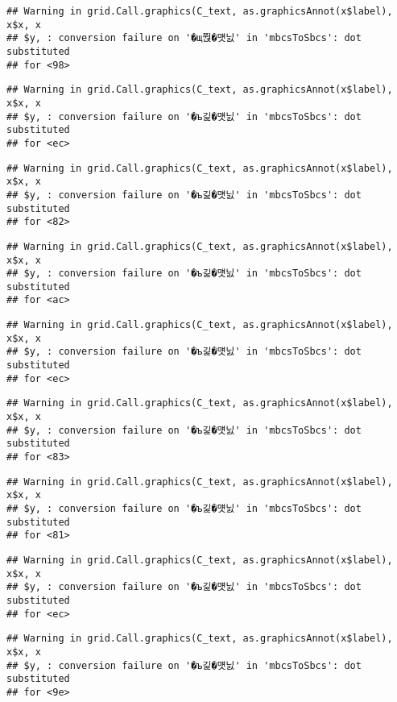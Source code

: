 \documentclass[]{article}
\begin{document}
\begin{verbatim}
## Warning in grid.Call.graphics(C_text, as.graphicsAnnot(x$label), x$x, x
## $y, : conversion failure on '�щ쭩�먯닔' in 'mbcsToSbcs': dot substituted
## for <98>
\end{verbatim}

\begin{verbatim}
## Warning in grid.Call.graphics(C_text, as.graphicsAnnot(x$label), x$x, x
## $y, : conversion failure on '�ъ긽�먯닔' in 'mbcsToSbcs': dot substituted
## for <ec>
\end{verbatim}

\begin{verbatim}
## Warning in grid.Call.graphics(C_text, as.graphicsAnnot(x$label), x$x, x
## $y, : conversion failure on '�ъ긽�먯닔' in 'mbcsToSbcs': dot substituted
## for <82>
\end{verbatim}

\begin{verbatim}
## Warning in grid.Call.graphics(C_text, as.graphicsAnnot(x$label), x$x, x
## $y, : conversion failure on '�ъ긽�먯닔' in 'mbcsToSbcs': dot substituted
## for <ac>
\end{verbatim}

\begin{verbatim}
## Warning in grid.Call.graphics(C_text, as.graphicsAnnot(x$label), x$x, x
## $y, : conversion failure on '�ъ긽�먯닔' in 'mbcsToSbcs': dot substituted
## for <ec>
\end{verbatim}

\begin{verbatim}
## Warning in grid.Call.graphics(C_text, as.graphicsAnnot(x$label), x$x, x
## $y, : conversion failure on '�ъ긽�먯닔' in 'mbcsToSbcs': dot substituted
## for <83>
\end{verbatim}

\begin{verbatim}
## Warning in grid.Call.graphics(C_text, as.graphicsAnnot(x$label), x$x, x
## $y, : conversion failure on '�ъ긽�먯닔' in 'mbcsToSbcs': dot substituted
## for <81>
\end{verbatim}

\begin{verbatim}
## Warning in grid.Call.graphics(C_text, as.graphicsAnnot(x$label), x$x, x
## $y, : conversion failure on '�ъ긽�먯닔' in 'mbcsToSbcs': dot substituted
## for <ec>
\end{verbatim}

\begin{verbatim}
## Warning in grid.Call.graphics(C_text, as.graphicsAnnot(x$label), x$x, x
## $y, : conversion failure on '�ъ긽�먯닔' in 'mbcsToSbcs': dot substituted
## for <9e>
\end{verbatim}
\end{document}
